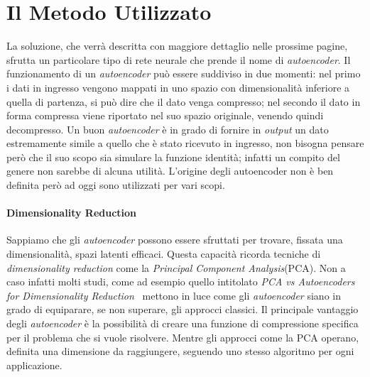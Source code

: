 %
%
%
%

\section{Il Metodo Utilizzato}
La soluzione, che verrà descritta con maggiore dettaglio nelle prossime pagine, sfrutta un particolare tipo di rete neurale che prende il nome di \textit{autoencoder}.
Il funzionamento di un \textit{autoencoder} può essere suddiviso in due momenti:
nel primo i dati in ingresso vengono mappati in uno spazio con dimensionalità inferiore a quella di partenza, si può dire che il dato venga compresso;
nel secondo il dato in forma compressa viene riportato nel suo spazio originale, venendo quindi decompresso.
Un buon \textit{autoencoder} è in grado di fornire in \textit{output} un dato estremamente simile a quello che è stato ricevuto in ingresso, non bisogna pensare però che il suo scopo sia simulare la funzione identità; infatti un compito del genere non sarebbe di alcuna utilità.
L'origine degli autoencoder non è ben definita però ad oggi sono utilizzati per vari scopi.

\paragraph{Dimensionality Reduction}
Sappiamo che gli \textit{autoencoder} possono essere sfruttati per trovare, fissata una dimensionalità, spazi latenti efficaci.
Questa capacità ricorda tecniche di \textit{dimensionality reduction} come la \textit{Principal Component Analysis}(PCA).
Non a caso infatti molti studi, come ad esempio quello intitolato \textit{PCA vs Autoencoders for Dimensionality Reduction}~\cite{pca_vs_ae_1} mettono in luce come gli \textit{autoencoder} siano in grado di equiparare, se non superare, gli approcci classici.
Il principale vantaggio degli \textit{autoencoder} è la possibilità di creare una funzione di compressione specifica per il problema che si vuole risolvere.
Mentre gli approcci come la PCA operano, definita una dimensione da raggiungere, seguendo uno stesso algoritmo per ogni applicazione.

